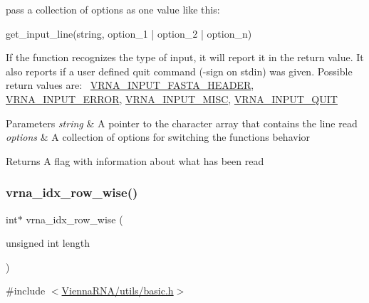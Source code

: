 pass a collection of options as one value like this\+: \begin{DoxyVerb}get_input_line(string, option_1 | option_2 | option_n) \end{DoxyVerb}


If the function recognizes the type of input, it will report it in the return value. It also reports if a user defined \textquotesingle{}quit\textquotesingle{} command (-\/sign on \textquotesingle{}stdin\textquotesingle{}) was given. Possible return values are\+:~\newline
\hyperlink{group__utils_ga2f0d8069e93d3ac54d9320d6bdb8e7e7}{V\+R\+N\+A\+\_\+\+I\+N\+P\+U\+T\+\_\+\+F\+A\+S\+T\+A\+\_\+\+H\+E\+A\+D\+ER}, \hyperlink{group__utils_gad403c9ea58f1836689404c2931419c8c}{V\+R\+N\+A\+\_\+\+I\+N\+P\+U\+T\+\_\+\+E\+R\+R\+OR}, \hyperlink{group__utils_ga8e3241b321c9c1a78a69e59e2e019a71}{V\+R\+N\+A\+\_\+\+I\+N\+P\+U\+T\+\_\+\+M\+I\+SC}, \hyperlink{group__utils_ga72f3c6ca5c83d2b9baed2922d19c403d}{V\+R\+N\+A\+\_\+\+I\+N\+P\+U\+T\+\_\+\+Q\+U\+IT}


\begin{DoxyParams}{Parameters}
{\em string} & A pointer to the character array that contains the line read \\
\hline
{\em options} & A collection of options for switching the functions behavior \\
\hline
\end{DoxyParams}
\begin{DoxyReturn}{Returns}
A flag with information about what has been read 
\end{DoxyReturn}
\mbox{\label{group__utils_ga70b180e9ea764218a82647a1cd347445}} 
\subsubsection{\texorpdfstring{vrna\+\_\+idx\+\_\+row\+\_\+wise()}{vrna\_idx\_row\_wise()}}
{\footnotesize\ttfamily int$\ast$ vrna\+\_\+idx\+\_\+row\+\_\+wise (\begin{DoxyParamCaption}\item[{unsigned int}]{length }\end{DoxyParamCaption})}



{\ttfamily \#include $<$\hyperlink{utils_2basic_8h}{Vienna\+R\+N\+A/utils/basic.\+h}$>$}



